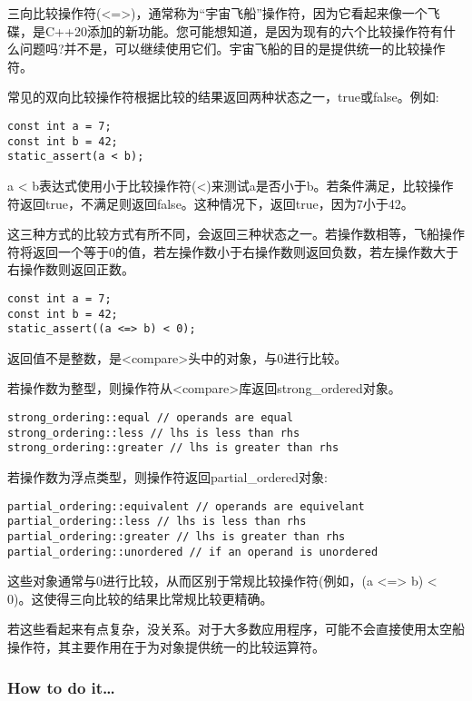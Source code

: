 
三向比较操作符(<=>)，通常称为“宇宙飞船”操作符，因为它看起来像一个飞碟，是C++20添加的新功能。您可能想知道，是因为现有的六个比较操作符有什么问题吗?并不是，可以继续使用它们。宇宙飞船的目的是提供统一的比较操作符。

常见的双向比较操作符根据比较的结果返回两种状态之一，true或false。例如:

\begin{lstlisting}[style=styleCXX]
const int a = 7;
const int b = 42;
static_assert(a < b);
\end{lstlisting}

a < b表达式使用小于比较操作符(<)来测试a是否小于b。若条件满足，比较操作符返回true，不满足则返回false。这种情况下，返回true，因为7小于42。

这三种方式的比较方式有所不同，会返回三种状态之一。若操作数相等，飞船操作符将返回一个等于0的值，若左操作数小于右操作数则返回负数，若左操作数大于右操作数则返回正数。

\begin{lstlisting}[style=styleCXX]
const int a = 7;
const int b = 42;
static_assert((a <=> b) < 0);
\end{lstlisting}

返回值不是整数，是<compare>头中的对象，与0进行比较。

若操作数为整型，则操作符从<compare>库返回strong\_ordered对象。

\begin{lstlisting}[style=styleCXX]
strong_ordering::equal // operands are equal
strong_ordering::less // lhs is less than rhs
strong_ordering::greater // lhs is greater than rhs
\end{lstlisting}

若操作数为浮点类型，则操作符返回partial\_ordered对象:

\begin{lstlisting}[style=styleCXX]
partial_ordering::equivalent // operands are equivelant
partial_ordering::less // lhs is less than rhs
partial_ordering::greater // lhs is greater than rhs
partial_ordering::unordered // if an operand is unordered
\end{lstlisting}

这些对象通常与0进行比较，从而区别于常规比较操作符(例如，(a <=> b) < 0)。这使得三向比较的结果比常规比较更精确。

若这些看起来有点复杂，没关系。对于大多数应用程序，可能不会直接使用太空船操作符，其主要作用在于为对象提供统一的比较运算符。

\subsubsection{How to do it…}

